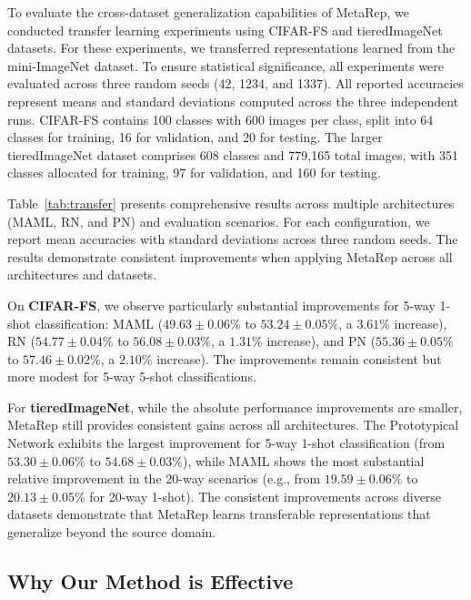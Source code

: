 To evaluate the cross-dataset generalization capabilities of MetaRep, we conducted transfer learning experiments using CIFAR-FS \cite{DBLP:journals/corr/abs-1805-08136} and tieredImageNet \cite{DBLP:journals/corr/abs-1803-00676} datasets. For these experiments, we transferred representations learned from the mini-ImageNet dataset. To ensure statistical significance, all experiments were evaluated across three random seeds (42, 1234, and 1337). All reported accuracies represent means and standard deviations computed across the three independent runs. CIFAR-FS contains 100 classes with 600 images per class, split into 64 classes for training, 16 for validation, and 20 for testing. The larger tieredImageNet dataset comprises 608 classes and 779,165 total images, with 351 classes allocated for training, 97 for validation, and 160 for testing.

Table~\ref{tab:transfer} presents comprehensive results across multiple architectures (MAML, RN, and PN) and evaluation scenarios. For each configuration, we report mean accuracies with standard deviations across three random seeds. The results demonstrate consistent improvements when applying MetaRep across all architectures and datasets.

On \textbf{CIFAR-FS}, we observe particularly substantial improvements for 5-way 1-shot classification: MAML ($49.63 \pm 0.06\%$ to $53.24 \pm 0.05\%$, a $3.61\%$ increase), RN ($54.77 \pm 0.04\%$ to $56.08 \pm 0.03\%$, a $1.31\%$ increase), and PN ($55.36 \pm 0.05\%$ to $57.46 \pm 0.02\%$, a $2.10\%$ increase). The improvements remain consistent but more modest for 5-way 5-shot classifications.

For \textbf{tieredImageNet}, while the absolute performance improvements are smaller, MetaRep still provides consistent gains across all architectures. The Prototypical Network exhibits the largest improvement for 5-way 1-shot classification (from $53.30 \pm 0.06\%$ to $54.68 \pm 0.03\%$), while MAML shows the most substantial relative improvement in the 20-way scenarios (e.g., from $19.59 \pm 0.06\%$ to $20.13 \pm 0.05\%$ for 20-way 1-shot). The consistent improvements across diverse datasets demonstrate that MetaRep learns transferable representations that generalize beyond the source domain.

\subsection{Why Our Method is Effective}

